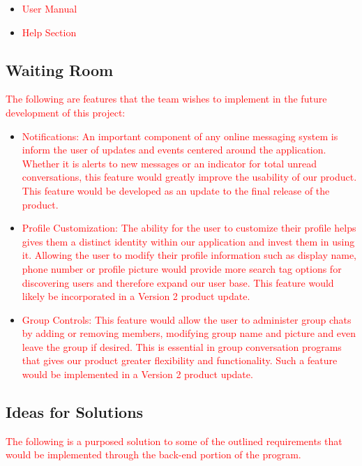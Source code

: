 \documentclass[12pt, titlepage]{article}
\begin{document}
{\begin{itemize}
    		\item \textcolor{red}{User Manual}
    		\item \textcolor{red}{Help Section}
    	\end{itemize}

    	\subsection{Waiting Room}
   	\textcolor{red}{The following are features that the team wishes to implement in the future development of this project:}\\
   	
   	\begin{itemize}
   		\item \textcolor{red}{Notifications: An important component of any online messaging system is inform the user of updates and events centered around the application. Whether it is alerts to new messages or an indicator for total unread conversations, this feature would greatly improve the usability of our product. This feature would be developed as an update to the final release of the product.}
   		\item \textcolor{red}{Profile Customization: The ability for the user to customize their profile helps gives them a distinct identity within our application and invest them in using it. Allowing the user to modify their profile information such as display name, phone number or profile picture would provide more search tag options for discovering users and therefore expand our user base. This feature would likely be incorporated in a Version 2 product update.}
   		\item \textcolor{red}{Group Controls: This feature would allow the user to administer group chats by adding or removing members, modifying group name and picture and even leave the group if desired. This is essential in group conversation programs that gives our product greater flexibility and functionality. Such a feature would be implemented in a Version 2 product update.}
   	\end{itemize}

    	\subsection{Ideas for Solutions}

	\textcolor{red}{The following is a purposed solution to some of the outlined requirements that would be implemented through the back-end portion of the program.}\\  	
    	
}
\end{document}

